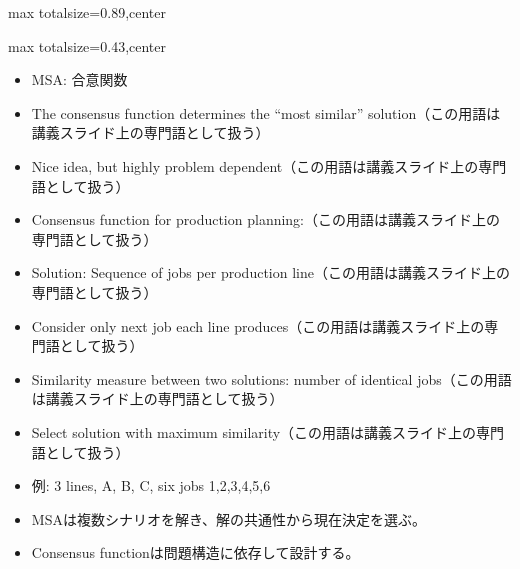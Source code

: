 \begin{minipage}[t]{0.58\textwidth}
\begin{adjustbox}{max totalsize={\textwidth}{0.89\textheight},center}
\begin{minipage}{\textwidth}
\end{minipage}
\end{adjustbox}
\end{minipage}


\clearpage
{}
\begin{minipage}[t]{0.405\textwidth}
\begin{adjustbox}{max totalsize={\textwidth}{0.43\textheight},center}
\begin{minipage}{\textwidth}\scriptsize
{}\begin{itemize}
\item MSA: 合意関数
\item The consensus function determines the “most similar” solution（この用語は講義スライド上の専門語として扱う）
\item Nice idea, but highly problem dependent（この用語は講義スライド上の専門語として扱う）
\item Consensus function for production planning:（この用語は講義スライド上の専門語として扱う）
\item Solution: Sequence of jobs per production line（この用語は講義スライド上の専門語として扱う）
\item Consider only next job each line produces（この用語は講義スライド上の専門語として扱う）
\item Similarity measure between two solutions: number of identical jobs（この用語は講義スライド上の専門語として扱う）
\item Select solution with maximum similarity（この用語は講義スライド上の専門語として扱う）
\item 例: 3 lines, A, B, C, six jobs 1,2,3,4,5,6
\end{itemize}\begin{itemize}
\item MSAは複数シナリオを解き、解の共通性から現在決定を選ぶ。
\item Consensus functionは問題構造に依存して設計する。
\end{itemize}
\end{minipage}
\end{adjustbox}
\end{minipage}\hfill
